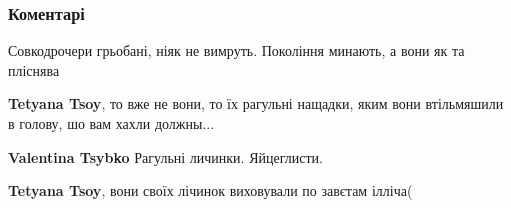  
 
 
 
 
\subsubsection{Коментарі}

\begin{itemize}
 
Совкодрочери грьобані, ніяк не вимруть. Покоління минають, а вони як та пліснява

\begin{itemize}
 
\textbf{Tetyana Tsoy}, то вже не вони, то їх рагульні нащадки, яким вони втільмяшили в голову, шо вам хахли должны...

 
\textbf{Valentina Tsybko}
Рагульні личинки. Яйцеглисти.

 
\textbf{Tetyana Tsoy}, вони своїх лічинок виховували по завєтам ілліча(

 

\end{itemize}
\end{itemize}
